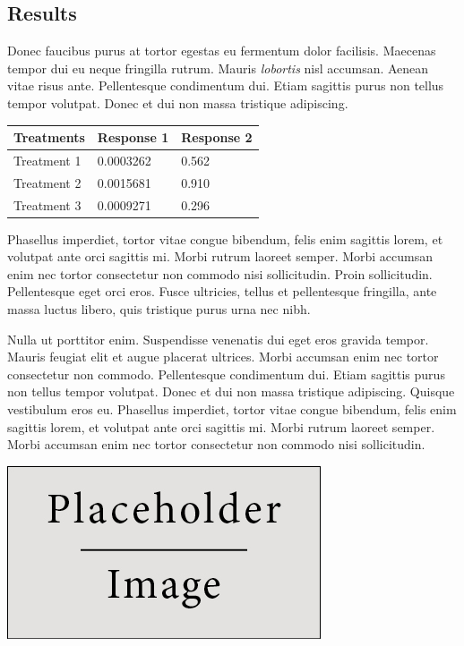 \documentclass[a0,landscape]{a0poster}
\begin{document}
\begin{multicols}{3}
\section*{Results}

Donec faucibus purus at tortor egestas eu fermentum dolor facilisis. Maecenas tempor dui eu neque fringilla rutrum. Mauris \emph{lobortis} nisl accumsan. Aenean vitae risus ante. Pellentesque condimentum dui. Etiam sagittis purus non tellus tempor volutpat. Donec et dui non massa tristique adipiscing.
%
\begin{table} %
\begin{tabular}{l l l}
\toprule
\textbf{Treatments} & \textbf{Response 1} & \textbf{Response 2}\\
\midrule
Treatment 1 & 0.0003262 & 0.562 \\
Treatment 2 & 0.0015681 & 0.910 \\
Treatment 3 & 0.0009271 & 0.296 \\
\bottomrule
\end{tabular}
\end{table}
%
Phasellus imperdiet, tortor vitae congue bibendum, felis enim sagittis lorem, et volutpat ante orci sagittis mi. Morbi rutrum laoreet semper. Morbi accumsan enim nec tortor consectetur non commodo nisi sollicitudin. Proin sollicitudin. Pellentesque eget orci eros. Fusce ultricies, tellus et pellentesque fringilla, ante massa luctus libero, quis tristique purus urna nec nibh.

Nulla ut porttitor enim. Suspendisse venenatis dui eget eros gravida tempor. Mauris feugiat elit et augue placerat ultrices. Morbi accumsan enim nec tortor consectetur non commodo. Pellentesque condimentum dui. Etiam sagittis purus non tellus tempor volutpat. Donec et dui non massa tristique adipiscing. Quisque vestibulum eros eu. Phasellus imperdiet, tortor vitae congue bibendum, felis enim sagittis lorem, et volutpat ante orci sagittis mi. Morbi rutrum laoreet semper. Morbi accumsan enim nec tortor consectetur non commodo nisi sollicitudin.

\begin{center}\vspace{1cm}
\includegraphics[width=0.8\linewidth]{placeholder}
\end{center}\vspace{1cm}


\end{multicols}
\end{document}
